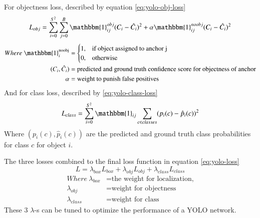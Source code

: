     For objectness loss, described by equation \ref{eq:yolo-obj-loss}
    \begin{equation}
      L_{obj} = \sum_{i=0}^{S^2} \sum_{j=0}^B \mathbbm{1}_{ij}^{obj}(C_i - \hat{C}_i)^2  + \alpha \mathbbm{1}_{ij}^{noobj}(C_i - \hat{C}_i)^2
      \label{eq:yolo-obj-loss}
    \end{equation}
    \begin{align*}
    Where~\mathbbm{1}_i^{\text{noobj}} &=\begin{cases} 
                                          1, & \text{if object assigned to anchor j}\\
                                          0, & \text{otherwise} 
                                         \end{cases}\\
          (C_i,\hat{C}_i) &= \text{predicted and ground truth confidence score for objectness of anchor}\\
          \alpha &= \text{weight to punish false positives}
    \end{align*}
    And for class loss, described by \ref{eq:yolo-class-loss}
    \begin{equation}
      L_{class} = \sum_{i=0}^{S^2} \mathbbm{1}_{ij} \sum_{c \in classes} (p_i(c) - \hat{p}_i(c))^2
      \label{eq:yolo-class-loss}
    \end{equation}
    Where $(p_i(c), \hat{p}_i(c))$ are the predicted and ground truth class probabilities for class $c$ for object $i$.

    The three losses combined to the final loss function in equation \ref{eq:yolo-loss}
    \begin{equation}
      L = \lambda_{box}L_{box} + \lambda_{obj}L_{obj} + \lambda_{class}L_{class}
      \label{eq:yolo-loss}
    \end{equation}
    \begin{align*}
      Where~\lambda_{box} &= \text{the weight for localization,}\\
      \lambda_{obj} &= \text{weight for objectness}\\
      \lambda_{class} &= \text{weight for class}
    \end{align*}
    These 3 $\lambda$-s can be tuned to optimize the performance of a YOLO network.

